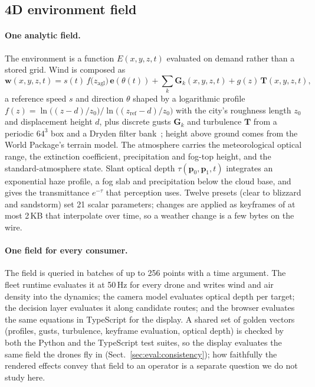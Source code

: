 \subsection{4D environment field}\label{sec:design:env}

\paragraph{One analytic field.} The environment is a function $E(x,y,z,t)$ evaluated on demand rather than a stored
grid. Wind is composed as
\begin{equation}
\mathbf{w}(x,y,z,t) = s(t)\, f\big(z_{\mathrm{agl}}\big)\, \mathbf{e}(\theta(t)) + \textstyle\sum_k \mathbf{G}_k(x,y,z,t)
 + g(z)\,\mathbf{T}(x,y,z,t),
\end{equation}
a reference speed $s$ and direction $\theta$ shaped by a logarithmic profile
$f(z) = \ln\!\big((z-d)/z_0\big)/\ln\!\big((z_{\mathrm{ref}}-d)/z_0\big)$ with the city's roughness length $z_0$ and
displacement height $d$, plus discrete gusts $\mathbf{G}_k$ and turbulence $\mathbf{T}$ from a periodic $64^3$ box and a
Dryden filter bank~\cite{beal1993digital}; height above ground comes from the World Package's terrain model. The
atmosphere carries the meteorological optical range, the extinction coefficient, precipitation and fog-top height, and
the standard-atmosphere state. Slant optical depth $\tau(\mathbf{p}_0,\mathbf{p}_1,t)$ integrates an exponential haze
profile, a fog slab and precipitation below the cloud base, and gives the transmittance $e^{-\tau}$ that perception uses.
Twelve presets (clear to blizzard and sandstorm) set 21 scalar parameters; changes are applied as keyframes of at most
2\,KB that interpolate over time, so a weather change is a few bytes on the wire.

\paragraph{One field for every consumer.} The field is queried in batches of up to 256 points with a time argument.
The fleet runtime evaluates it at 50\,Hz for every drone and writes wind and air density into the dynamics; the
camera model evaluates optical depth per target; the decision layer evaluates it along candidate routes; and the
browser evaluates the same equations in TypeScript for the display. A shared set of golden vectors (profiles, gusts,
turbulence, keyframe evaluation, optical depth) is checked by both the Python and the TypeScript test suites, so the
display evaluates the same field the drones fly in (Sect.~\ref{sec:eval:consistency}); how faithfully the rendered
effects convey that field to an operator is a separate question we do not study here.

